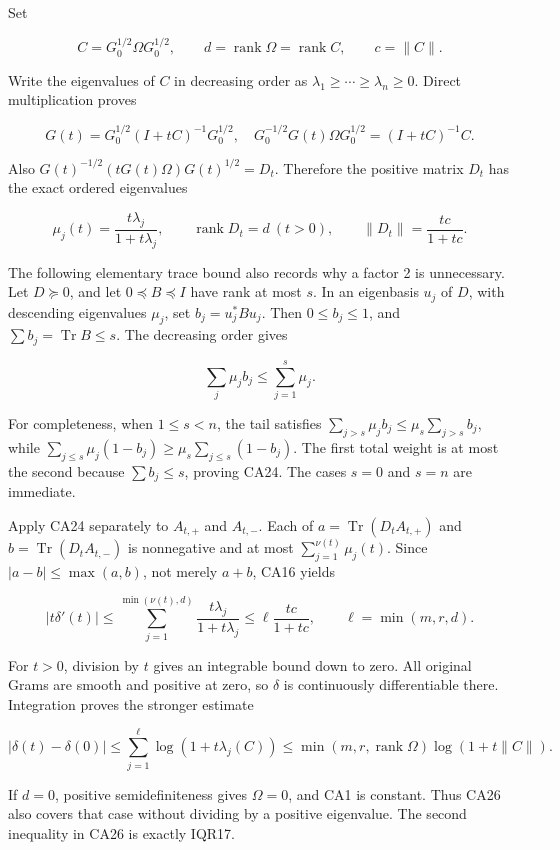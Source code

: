 Set

\[
C=G_0^{1/2}\Omega G_0^{1/2},\qquad
d=\operatorname{rank}\Omega=\operatorname{rank}C,
\qquad c=\|C\|.
\tag{CA21}
\]

Write the eigenvalues of \(C\) in decreasing order as \(\lambda_1\ge\cdots\ge\lambda_n\ge0\). Direct multiplication proves

\[
G(t)=G_0^{1/2}(I+tC)^{-1}G_0^{1/2},
\quad
G_0^{-1/2}G(t)\Omega G_0^{1/2}=(I+tC)^{-1}C.
\tag{CA22}
\]

Also \(G(t)^{-1/2}(tG(t)\Omega)G(t)^{1/2}=D_t\). Therefore the positive matrix \(D_t\) has the exact ordered eigenvalues

\[
\mu_j(t)=\frac{t\lambda_j}{1+t\lambda_j},
\qquad
\operatorname{rank}D_t=d\ (t>0),
\qquad \|D_t\|=\frac{tc}{1+tc}.
\tag{CA23}
\]

The following elementary trace bound also records why a factor 2 is unnecessary. Let \(D\succeq0\), and let \(0\preceq B\preceq I\) have rank at most \(s\). In an eigenbasis \(u_j\) of \(D\), with descending eigenvalues \(\mu_j\), set \(b_j=u_j^*Bu_j\). Then \(0\le b_j\le1\), and \(\sum b_j=\operatorname{Tr}B\le s\). The decreasing order gives

\[
\sum_j\mu_jb_j\le\sum_{j=1}^s\mu_j.
\tag{CA24}
\]

For completeness, when \(1\le s<n\), the tail satisfies \(\sum_{j>s}\mu_jb_j\le\mu_s\sum_{j>s}b_j\), while \(\sum_{j\le s}\mu_j(1-b_j)\ge\mu_s\sum_{j\le s}(1-b_j)\). The first total weight is at most the second because \(\sum b_j\le s\), proving CA24. The cases \(s=0\) and \(s=n\) are immediate.

Apply CA24 separately to \(A_{t,+}\) and \(A_{t,-}\). Each of \(a=\operatorname{Tr}(D_tA_{t,+})\) and \(b=\operatorname{Tr}(D_tA_{t,-})\) is nonnegative and at most \(\sum_{j=1}^{\nu(t)}\mu_j(t)\). Since \(|a-b|\le\max(a,b)\), not merely \(a+b\), CA16 yields

\[
|t\delta'(t)|
\le\sum_{j=1}^{\min(\nu(t),d)}\frac{t\lambda_j}{1+t\lambda_j}
\le\ell\frac{tc}{1+tc},
\qquad \ell=\min(m,r,d).
\tag{CA25}
\]

For \(t>0\), division by \(t\) gives an integrable bound down to zero. All original Grams are smooth and positive at zero, so \(\delta\) is continuously differentiable there. Integration proves the stronger estimate

\[
\boxed{
|\delta(t)-\delta(0)|
\le\sum_{j=1}^{\ell}\log(1+t\lambda_j(C))
\le\min(m,r,\operatorname{rank}\Omega)\log(1+t\|C\|).
}
\tag{CA26}
\]

If \(d=0\), positive semidefiniteness gives \(\Omega=0\), and CA1 is constant. Thus CA26 also covers that case without dividing by a positive eigenvalue. The second inequality in CA26 is exactly IQR17.


